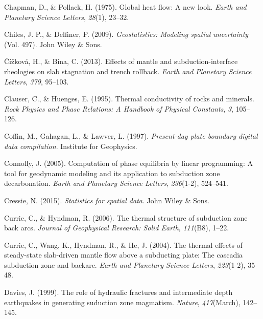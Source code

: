 \begin{CSLReferences}{1}{1}
\leavevmode{}%
Chapman, D., \& Pollack, H. (1975). Global heat flow: A new look. \emph{Earth and Planetary Science Letters}, \emph{28}(1), 23--32.

\leavevmode{}%
Chiles, J. P., \& Delfiner, P. (2009). \emph{Geostatistics: Modeling spatial uncertainty} (Vol. 497). John Wiley \& Sons.

\leavevmode{}%
Čížková, H., \& Bina, C. (2013). Effects of mantle and subduction-interface rheologies on slab stagnation and trench rollback. \emph{Earth and Planetary Science Letters}, \emph{379}, 95--103.

\leavevmode{}%
Clauser, C., \& Huenges, E. (1995). Thermal conductivity of rocks and minerals. \emph{Rock Physics and Phase Relations: A Handbook of Physical Constants}, \emph{3}, 105--126.

\leavevmode{}%
Coffin, M., Gahagan, L., \& Lawver, L. (1997). \emph{Present-day plate boundary digital data compilation}. Institute for Geophysics.

\leavevmode{}%
Connolly, J. (2005). Computation of phase equilibria by linear programming: A tool for geodynamic modeling and its application to subduction zone decarbonation. \emph{Earth and Planetary Science Letters}, \emph{236}(1-2), 524--541.

\leavevmode{}%
Cressie, N. (2015). \emph{Statistics for spatial data}. John Wiley \& Sons.

\leavevmode{}%
Currie, C., \& Hyndman, R. (2006). The thermal structure of subduction zone back arcs. \emph{Journal of Geophysical Research: Solid Earth}, \emph{111}(B8), 1--22.

\leavevmode{}%
Currie, C., Wang, K., Hyndman, R., \& He, J. (2004). The thermal effects of steady-state slab-driven mantle flow above a subducting plate: The cascadia subduction zone and backarc. \emph{Earth and Planetary Science Letters}, \emph{223}(1-2), 35--48.

\leavevmode{}%
Davies, J. (1999). The role of hydraulic fractures and intermediate depth earthquakes in generating suduction zone magmatism. \emph{Nature}, \emph{417}(March), 142--145.


\end{CSLReferences}
